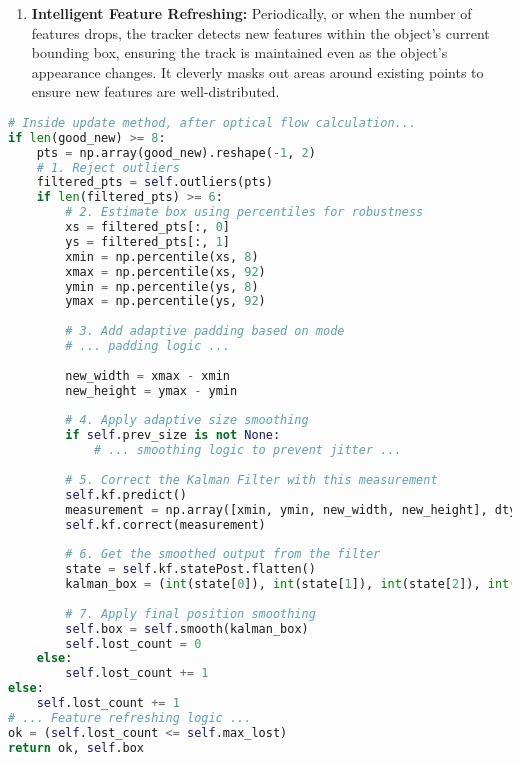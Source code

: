 \documentclass[12pt, a4paper]{article}
\begin{document}
\begin{enumerate}
    \item \textbf{Intelligent Feature Refreshing:} Periodically, or when the number of features drops, the tracker detects new features within the object's current bounding box, ensuring the track is maintained even as the object's appearance changes. It cleverly masks out areas around existing points to ensure new features are well-distributed.
\end{enumerate}

\begin{lstlisting}[language=Python, caption={Key logic inside the update method for bounding box estimation.}, label={lst:update_logic}]
# Inside update method, after optical flow calculation...
if len(good_new) >= 8:
    pts = np.array(good_new).reshape(-1, 2)
    # 1. Reject outliers
    filtered_pts = self.outliers(pts)
    if len(filtered_pts) >= 6:
        # 2. Estimate box using percentiles for robustness
        xs = filtered_pts[:, 0]
        ys = filtered_pts[:, 1]
        xmin = np.percentile(xs, 8)
        xmax = np.percentile(xs, 92)
        ymin = np.percentile(ys, 8)
        ymax = np.percentile(ys, 92)
        
        # 3. Add adaptive padding based on mode
        # ... padding logic ...
        
        new_width = xmax - xmin
        new_height = ymax - ymin
        
        # 4. Apply adaptive size smoothing
        if self.prev_size is not None:
            # ... smoothing logic to prevent jitter ...
        
        # 5. Correct the Kalman Filter with this measurement
        self.kf.predict()
        measurement = np.array([xmin, ymin, new_width, new_height], dtype=np.float32)
        self.kf.correct(measurement)
        
        # 6. Get the smoothed output from the filter
        state = self.kf.statePost.flatten()
        kalman_box = (int(state[0]), int(state[1]), int(state[2]), int(state[3]))
        
        # 7. Apply final position smoothing
        self.box = self.smooth(kalman_box)
        self.lost_count = 0
    else:
        self.lost_count += 1
else:
    self.lost_count += 1
# ... Feature refreshing logic ...
ok = (self.lost_count <= self.max_lost)
return ok, self.box
\end{lstlisting}
\end{document}
